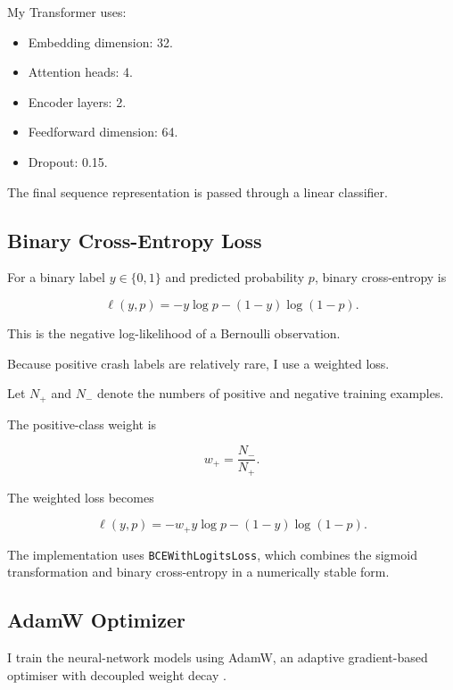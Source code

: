 \documentclass[oneside,english,11pt]{article}
\renewcommand{\boxed}[1]{#1}
\begin{document}
My Transformer uses:

\begin{itemize}
\item Embedding dimension: 32.
\item Attention heads: 4.
\item Encoder layers: 2.
\item Feedforward dimension: 64.
\item Dropout: 0.15.
\end{itemize}

The final sequence representation is
passed through a linear classifier.

\subsection{Binary Cross-Entropy Loss}

For a binary label $y\in\{0,1\}$
and predicted probability $p$,
binary cross-entropy is

\begin{equation}
\boxed{
\ell(y,p)
=
-y\log p
-
(1-y)\log(1-p).
}
\end{equation}

This is the negative log-likelihood
of a Bernoulli observation.

Because positive crash labels are relatively
rare, I use a weighted loss.

Let $N_+$ and $N_-$ denote the numbers
of positive and negative training examples.

The positive-class weight is

\begin{equation}
\boxed{
w_+=\frac{N_-}{N_+}.
}
\end{equation}

The weighted loss becomes

\begin{equation}
\boxed{
\ell(y,p)
=
-w_+y\log p
-
(1-y)\log(1-p).
}
\end{equation}

The implementation uses
\texttt{BCEWithLogitsLoss}, which combines
the sigmoid transformation and binary
cross-entropy in a numerically stable form.

\subsection{AdamW Optimizer}

I train the neural-network models using
AdamW, an adaptive gradient-based optimiser
with decoupled weight decay
\citep{loshchilov2019}.
\end{document}
